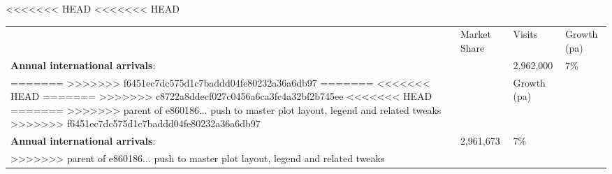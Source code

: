 <<<<<<< HEAD
<<<<<<< HEAD
\begin{tabular}[t]{p{2.95cm}>{\hfill}p{1.35cm}>{\hfill}p{1.1cm}>{\hfill}p{1.7cm}}
   & Market Share & Visits & Growth (pa) \\ 
 \textbf{Annual international arrivals}: &   & 2,962,000 & 7\% \\ 
=======
>>>>>>> f6451ec7dc575d1c7baddd04fe80232a36a6db97
=======
<<<<<<< HEAD
=======
>>>>>>> c8722a8ddecf027c0456a6ca3fc4a32bf2b745ee
<<<<<<< HEAD
=======
>>>>>>> parent of e860186... push to master plot layout, legend and related tweaks
>>>>>>> f6451ec7dc575d1c7baddd04fe80232a36a6db97
\begin{tabular}[t]{p{4.8cm}>{\hfill}p{1.3cm}>{\hfill}p{1.4cm}}
   &   & Growth (pa) \\ 
 \textbf{Annual international arrivals}: & 2,961,673 & 7\% \\ 
>>>>>>> parent of e860186... push to master plot layout, legend and related tweaks
  \end{tabular}
